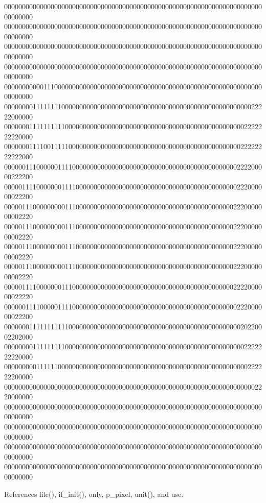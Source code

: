 00000000000000000000000000000000000000000000000000000000000000000000000000000000 00000000000000000000000000000000000000000000000000000000000000000000000000000000 00000000000000000000000000000000000000000000000000000000000000000000000000000000 00000000000000000000000000000000000000000000000000000000000000000000000000000000 00000000000111000000000000000000000000000000000000000000000000000000000000000000 00000000111111110000000000000000000000000000000000000000000000000000022222000000 00000001111111111000000000000000000000000000000000000000000000000002222222220000 00000001111001111100000000000000000000000000000000000000000000000022222222222000 00000011100000011110000000000000000000000000000000000000000000000222200000222200 00000111100000001111000000000000000000000000000000000000000000000222000000022200 00000111000000000111000000000000000000000000000000000000000000002220000000002220 00000111000000000111000000000000000000000000000000000000000000002220000000002220 00000111000000000111000000000000000000000000000000000000000000002220000000002220 00000111000000000111000000000000000000000000000000000000000000002220000000002220 00000111100000001110000000000000000000000000000000000000000000002222000000022220 00000011110000011110000000000000000000000000000000000000000000000222000000022200 00000001111111111100000000000000000000000000000000000000000000000020220002202000 00000000111111111000000000000000000000000000000000000000000000000002222222220000 00000000011111100000000000000000000000000000000000000000000000000000222222200000 00000000000000000000000000000000000000000000000000000000000000000000002220000000 00000000000000000000000000000000000000000000000000000000000000000000000000000000 00000000000000000000000000000000000000000000000000000000000000000000000000000000 00000000000000000000000000000000000000000000000000000000000000000000000000000000 00000000000000000000000000000000000000000000000000000000000000000000000000000000 

References file(), if\+\_\+init(), only, p\+\_\+pixel, unit(), and use.

